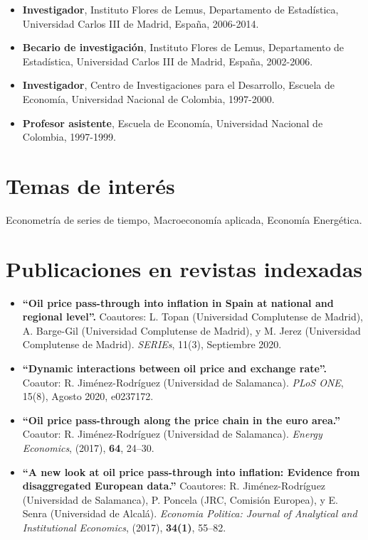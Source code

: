 \documentclass[11pt]{article}\usepackage[]{graphicx}\usepackage[usenames,dvipsnames]{xcolor}
\begin{document}
{\begin{itemize}
  \item \textbf{Investigador}, Instituto Flores de Lemus, Departamento de Estadística, Universidad Carlos III de Madrid, España, 2006-2014.
  \item \textbf{Becario de investigación}, Instituto Flores de Lemus, Departamento de Estadística, Universidad Carlos III de Madrid, España, 2002-2006.
  \item \textbf{Investigador}, Centro de Investigaciones para el Desarrollo, Escuela de Economía, Universidad Nacional de Colombia, 1997-2000.
  \item \textbf{Profesor asistente}, Escuela de Economía, Universidad Nacional de Colombia, 1997-1999.
\end{itemize}

\section{Temas de interés}

Econometría de series de tiempo, Macroeconomía aplicada, Economía Energética.

\section{Publicaciones en revistas indexadas}

\begin{itemize}
  \item \textbf{``Oil price pass-through into inflation in Spain at national and regional level''.} Coautores: L. Topan (Universidad Complutense de Madrid), A. Barge-Gil (Universidad Complutense de Madrid), y M. Jerez (Universidad Complutense de Madrid). \emph{SERIEs}, 11(3), Septiembre 2020.
  
  \item \textbf{``Dynamic interactions between oil price and exchange rate''.} Coautor: R. Jiménez-Rodríguez (Universidad de Salamanca). \emph{PLoS ONE}, 15(8), Agosto 2020,  e0237172.
  
  \item \textbf{``Oil price pass-through along the price chain in the euro area.''} Coautor: R. Jiménez-Rodríguez (Universidad de Salamanca). \emph{Energy Economics}, (2017), \textbf{64}, 24--30.

\item \textbf{``A new look at oil price pass-through into inflation: Evidence from disaggregated European data.''} Coautores: R. Jiménez-Rodríguez (Universidad de  Salamanca), P. Poncela (JRC, Comisión Europea), y E. Senra (Universidad de Alcalá). \emph{Economia Politica: Journal of Analytical and Institutional Economics}, (2017), \textbf{34(1)}, 55--82.


\end{itemize}}
\end{document}

